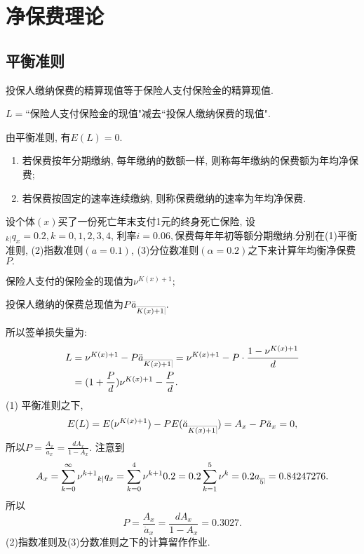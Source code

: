 \documentclass[lang=cn,10pt]{elegantbook}
\makeatletter
\DeclareRobustCommand{\annu}[1]{_{%
    \def\arraystretch{0}%
    \setlength\arraycolsep{1pt}%
    \setlength\arrayrulewidth{.2pt}%
    \begin{array}[b]{@{}c|}\hline
        \\[\arraycolsep]%
        \scriptstyle #1%
    \end{array}%
}}
\makeatother
\begin{document}
\chapter{净保费理论}
\section{平衡准则}
\begin{definition}[平衡准则]
    投保人缴纳保费的精算现值等于保险人支付保险金的精算现值.
\end{definition}

\begin{definition}[保险人签单损失量]
    $L=$``保险人支付保险金的现值"减去``投保人缴纳保费的现值".

由平衡准则, 有$E(L)=0.$
\end{definition}

\begin{definition}[年均衡净保费]
    \begin{enumerate}
        \item 若保费按年分期缴纳, 每年缴纳的数额一样, 则称每年缴纳的保费额为年均净保费; 
        \item 若保费按固定的速率连续缴纳, 则称保费缴纳的速率为年均净保费.
    \end{enumerate}
\end{definition}

\begin{example}\label{e4.1}
    设个体$(x)$买了一份死亡年末支付1元的终身死亡保险, 设$_{k| }q_x=0.2,k=0,1,2,3,4$, 利率$i=0.06,$保费每年年初等额分期缴纳.分别在(1)平衡准则, (2)指数准则$(a=0.1)$, (3)分位数准则$(\alpha=0.2)$之下来计算年均衡净保费$P.$
 \end{example}
 \begin{solution} 
    保险人支付的保险金的现值为$\nu^{K(x)+1};$
 
 投保人缴纳的保费总现值为$P\ddot a_{\annu {K(x)+1}}.$
 
 所以签单损失量为:
 \begin{align*}
     L & =\nu^{K(x)+1}-P\ddot a_{\annu {K(x)+1}}=\nu^{K(x)+1}-P\cdot\frac{1-\nu^{K(x)+1}}{d} \\
         & =(1+\frac{P}{d})\nu^{K(x)+1}-\frac{P}{d}. \\
 \end{align*}
 (1) 平衡准则之下,
 $$E(L)=E(\nu^{K(x)+1})-PE(\ddot a_{\annu {K(x)+1}})=A_x-P\ddot a_{x}=0,$$
 所以$P=\frac{A_x}{\ddot a_{x}}=\frac{dA_x}{1-A_x}.$
 注意到$$
     A_x  =\sum_{k=0}^{\infty }{\nu^{k+1}{}_{k|}q_x}=\sum_{k=0}^4{\nu^{k+1}0.2}=0.2\sum_{k=1}^{5}{\nu^k}=0.2a_{\annu 5}=0.84247276.
 $$
 所以$$P=\frac{A_x}{\ddot a_{x}}=\frac{dA_x}{1-A_x}=0.3027.$$
 (2)指数准则及(3)分数准则之下的计算留作作业. 
\end{solution}
\end{document}
